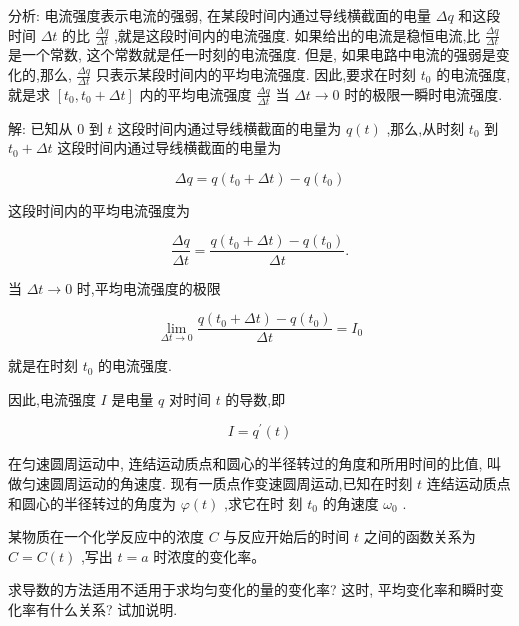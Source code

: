 \documentclass[lang=cn,newtx,12pt,scheme=chinese]{elegantbook}
\begin{document}
分析: 电流强度表示电流的强弱, 在某段时间内通过导线横截面的电量 \({\Delta q}\) 和这段时间 \({\Delta t}\) 的比 \(\frac{\Delta q}{\Delta t}\) ,就是这段时间内的电流强度. 如果给出的电流是稳恒电流,比 \(\frac{\Delta q}{\Delta t}\) 是一个常数, 这个常数就是任一时刻的电流强度. 但是, 如果电路中电流的强弱是变化的,那么, \(\frac{\Delta q}{\Delta t}\) 只表示某段时间内的平均电流强度. 因此,要求在时刻 \({t}_{0}\) 的电流强度,就是求 \(\left\lbrack {{t}_{0},{t}_{0} + {\Delta t}}\right\rbrack\) 内的平均电流强度 \(\frac{\Delta q}{\Delta t}\) 当 \({\Delta t} \rightarrow 0\) 时的极限一瞬时电流强度.

解: 已知从 0 到 \(t\) 这段时间内通过导线横截面的电量为 \(q\left( t\right)\) ,那么,从时刻 \({t}_{0}\) 到 \({t}_{0} + {\Delta t}\) 这段时间内通过导线横截面的电量为

\[
{\Delta q} = q\left( {{t}_{0} + {\Delta t}}\right) - q\left( {t}_{0}\right)
\]

这段时间内的平均电流强度为

\[
\frac{\Delta q}{\Delta t} = \frac{q\left( {{t}_{0} + {\Delta t}}\right) - q\left( {t}_{0}\right) }{\Delta t}.
\]

当 \({\Delta t} \rightarrow 0\) 时,平均电流强度的极限

\[
\mathop{\lim }\limits_{{{\Delta t} \rightarrow 0}}\frac{q\left( {{t}_{0} + {\Delta t}}\right) - q\left( {t}_{0}\right) }{\Delta t} = {I}_{0}
\]

就是在时刻 \({t}_{0}\) 的电流强度.

因此,电流强度 \(I\) 是电量 \(q\) 对时间 \(t\) 的导数,即

\[
I = {q}^{\prime }\left( t\right)
\]

\begin{problemset}[练习]

\item 在匀速圆周运动中, 连结运动质点和圆心的半径转过的角度和所用时间的比值, 叫做匀速圆周运动的角速度. 现有一质点作变速圆周运动,已知在时刻 \(t\) 连结运动质点和圆心的半径转过的角度为 \(\varphi \left( t\right)\) ,求它在时 刻 \({t}_{0}\) 的角速度 \({\omega }_{0}\) .

\item 某物质在一个化学反应中的浓度 \(C\) 与反应开始后的时间 \(t\) 之间的函数关系为 \(C = C\left( t\right)\) ,写出 \(t = a\) 时浓度的变化率。

\item 求导数的方法适用不适用于求均匀变化的量的变化率? 这时, 平均变化率和瞬时变化率有什么关系? 试加说明.

\end{problemset}
\end{document}

